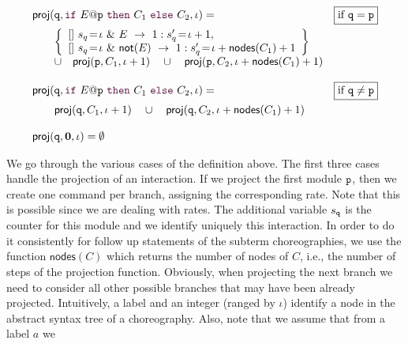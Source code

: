 \begin{definition}
\begin{displaymath}
\begin{array}{lr}
          \proj (\role q,\ifTE {E}{p}{C_1}{C_2}, \iota) = 
          &  \boxed{\text{if }\role q=\role p}\\[2mm]
          \qquad\left\{ 
          \begin{array}{lll}
            \commandBase {} {s_{q}\!=\! \iota\ \&\ E}{\ 1: s'_{q}\!=\! \iota+1},\\ 
            \commandBase {} {s_{q}\!=\! \iota\ \&\ \mathsf{not}(E)}
            {\ 1: s'_{q}\!=\! \iota+\mathsf{nodes}(C_1)+1}
          \end{array}
          \right\}
          \\
          \qquad\cup\quad \proj (\role{p}, C_1, \iota+1)
          \quad\cup\quad
          \proj (\role{p}, C_2, \iota+\mathsf{nodes}(C_1)+1)
          \\\\

          \proj (\role q,\ifTE {E}{p}{C_1}{C_2}, \iota) = 
          &  \boxed{\text{if }\role q\neq\role p}\\[2mm]
          \qquad\proj (\role{q}, C_1, \iota+1)
          \quad\cup\quad
          \proj (\role{q}, C_2, \iota+\mathsf{nodes}(C_1)+1)

          \\\\

          \proj (\role q,\CEnd, \iota) = \emptyset

        \end{array}
      \end{displaymath}
    \end{definition}
    We go through the various cases of the definition above. The first
    three cases handle the projection of an interaction. If we project
    the first module $\mathtt{p}$, then we create one command per branch,
    assigning the corresponding rate. Note that this is possible since
    we are dealing with rates. The additional variable $s_{\mathtt{q}}$
    is the counter for this module and we identify uniquely this
    interaction. In order to do it consistently for follow up
    statements of the subterm choreographies, we use the function
    $\mathsf{nodes}(C)$ which returns the number of nodes of $C$,
    i.e., the number of steps of the projection function. Obviously,
    when projecting the next branch we need to consider all
    other possible branches that may have been already
    projected. Intuitively, a label and an integer (ranged by $\iota$)
    identify a node in the abstract syntax tree of a
    choreography. Also, note that we assume that from a label $a$ we
